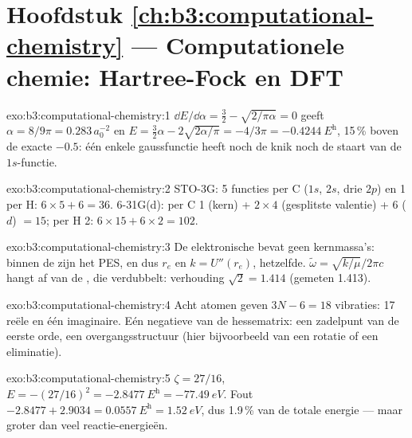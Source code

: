 \section*{Hoofdstuk \ref{ch:b3:computational-chemistry} --- Computationele chemie: Hartree-Fock en DFT}

\begin{solution}{exo:b3:computational-chemistry:1}
$\dd E/\dd\alpha = \frac32 - \sqrt{2/\pi\alpha} = 0$ geeft $\alpha = 8/9\pi = 0.283\,
a_0^{-2}$ en $E = \frac32\alpha - 2\sqrt{2\alpha/\pi} = -4/3\pi = \qty{-0.4244}{\hartree}$,
15\,\% boven de exacte $-0.5$: één enkele gaussfunctie heeft noch de knik
noch de staart van de $1s$-functie.
\end{solution}

\begin{solution}{exo:b3:computational-chemistry:2}
STO-3G: 5 functies per C ($1s$, $2s$, drie $2p$) en 1 per H: $6 \times 5 + 6 =
36$. 6-31G(d): per C 1 (kern) + $2 \times 4$ (gesplitste valentie) + 6 ($d$) $= 15$;
per H 2: $6 \times 15 + 6 \times 2 = 102$.
\end{solution}

\begin{solution}{exo:b3:computational-chemistry:3}
De elektronische  bevat geen kernmassa's: binnen de
 zijn het PES, en dus $r_e$ en $k = U''(r_e)$,
hetzelfde. $\tilde\omega = \sqrt{k/\mu}/2\pi c$ hangt af van de
, die verdubbelt: verhouding $\sqrt2 = 1.414$ (gemeten 1.413).
\end{solution}

\begin{solution}{exo:b3:computational-chemistry:4}
Acht atomen geven $3N - 6 = 18$ vibraties: 17 reële en één imaginaire. Eén
negatieve  van de hessematrix: een zadelpunt van de eerste
orde, een overgangsstructuur (hier bijvoorbeeld van een rotatie of een
eliminatie).
\end{solution}

\begin{solution}{exo:b3:computational-chemistry:5}
$\zeta = 27/16$, $E = -(27/16)^2 = \qty{-2.8477}{\hartree} = \qty{-77.49}{eV}$.
Fout $-2.8477 + 2.9034 = \qty{0.0557}{\hartree} = \qty{1.52}{eV}$, dus
1.9\,\% van de totale energie --- maar groter dan veel reactie-energieën.
\end{solution}

